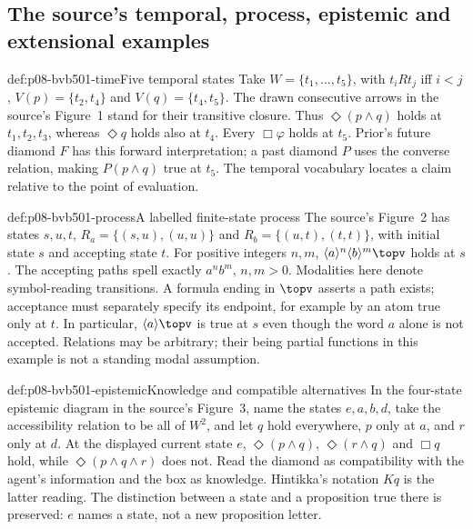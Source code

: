\subsection{The source's temporal, process, epistemic and extensional examples}
\label{sec:p08-bvb501-graph-examples}

\begin{hbexample}{def:p08-bvb501-time}{Five temporal states}
Take \(W=\{t_1,\ldots,t_5\}\), with \(t_iRt_j\) iff \(i<j\),
\(V(p)=\{t_2,t_4\}\) and \(V(q)=\{t_4,t_5\}\).
The drawn consecutive arrows in the source's Figure~1 stand for their
transitive closure. Thus \(\Diamond(p\land q)\) holds at
\(t_1,t_2,t_3\), whereas \(\Diamond q\) holds also at \(t_4\).
Every \(\Box\varphi\) holds at \(t_5\). Prior's future diamond
\(F\) has this forward interpretation; a past diamond \(P\) uses the
converse relation, making \(P(p\land q)\) true at \(t_5\).
The temporal vocabulary locates a claim relative to the point of evaluation.
\end{hbexample}

\begin{hbexample}{def:p08-bvb501-process}{A labelled finite-state process}
The source's Figure~2 has states \(s,u,t\),
\(R_a=\{(s,u),(u,u)\}\) and
\(R_b=\{(u,t),(t,t)\}\), with initial state \(s\) and accepting
state \(t\). For positive integers \(n,m\),
\(\langle a\rangle^n\langle b\rangle^m\topv\) holds at \(s\).
The accepting paths spell exactly \(a^n b^m\), \(n,m>0\).
Modalities here denote symbol-reading transitions. A formula ending in
\(\topv\) asserts a path exists; acceptance must separately specify its
endpoint, for example by an atom true only at \(t\). In particular,
\(\langle a\rangle\topv\) is true at \(s\) even though the word
\(a\) alone is not accepted. Relations may be arbitrary; their being
partial functions in this example is not a standing modal assumption.
\end{hbexample}

\begin{hbexample}{def:p08-bvb501-epistemic}{Knowledge and compatible alternatives}
In the four-state epistemic diagram in the source's Figure~3, name the states
\(e,a,b,d\), take the accessibility relation to be all of \(W^2\), and
let \(q\) hold everywhere, \(p\) only at \(a\), and \(r\) only at
\(d\). At the displayed current state \(e\),
\(\Diamond(p\land q)\), \(\Diamond(r\land q)\) and \(\Box q\)
hold, while \(\Diamond(p\land q\land r)\) does not.
Read the diamond as compatibility with the agent's information and the
box as knowledge. Hintikka's notation \(Kq\) is the latter reading.
The distinction between a state and a proposition true there is preserved:
\(e\) names a state, not a new proposition letter.
\end{hbexample}


